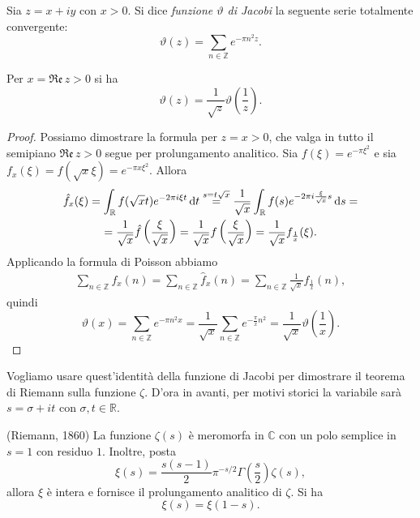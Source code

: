 \begin{defn}
  Sia $z=x+iy$ con $x>0$. Si dice \textit{funzione $\vartheta$ di Jacobi} la seguente serie totalmente convergente:
  $$\vartheta(z)=\sum_{n \in \mathbb{Z}} e^{-\pi n^2z}.$$
\end{defn}

\begin{lm}
  Per $x=\mathfrak{Re}\,z>0$ si ha
  $$\vartheta(z)=\frac{1}{\sqrt{z}}\vartheta\left(\frac{1}{z}\right).$$
\end{lm}

\begin{proof}
  Possiamo dimostrare la formula per $z=x>0$, che valga in tutto il semipiano $\mathfrak{Re}\,z>0$ segue per prolungamento analitico. Sia $f(\xi)=e^{-\pi\xi^2}$ e sia $f_x(\xi)=f(\sqrt{x}\xi)=e^{-\pi x\xi^2}$. Allora
  \begin{gather*}
    \hat{f}_x(\xi)=\int_{\mathbb{R}} f(\sqrt{x}t)e^{-2\pi i\xi t}\mathop{}\!\mathrm{d} t \overset{s=t\sqrt{x}}{=} \frac{1}{\sqrt{x}}\int_{\mathbb{R}} f(s)e^{-2\pi i\frac{\xi}{\sqrt{x}}s}\mathop{}\!\mathrm{d} s= \\
    =\frac{1}{\sqrt{x}}\hat{f}\left(\frac{\xi}{\sqrt{x}}\right)=\frac{1}{\sqrt{x}}f\left(\frac{\xi}{\sqrt{x}}\right)=\frac{1}{\sqrt{x}}f_{\frac{1}{x}}(\xi).
  \end{gather*}
  Applicando la formula di Poisson abbiamo
  \begin{gather*}
    \sum_{n \in \mathbb{Z}} f_x(n)=\sum_{n \in \mathbb{Z}} \hat{f}_x(n)=\sum_{n \in \mathbb{Z}} \frac{1}{\sqrt{x}}f_{\frac{1}{x}}(n),
  \end{gather*}
  quindi
  $$\vartheta(x)=\sum_{n \in \mathbb{Z}} e^{-\pi n^2x}=\frac{1}{\sqrt{x}}\sum_{n \in \mathbb{Z}}e^{-\frac{\pi}{x}n^2}=\frac{1}{\sqrt{x}}\vartheta\left(\frac{1}{x}\right).$$
\end{proof}

Vogliamo usare quest'identità della funzione di Jacobi per dimostrare il teorema di Riemann sulla funzione $\zeta$. D'ora in avanti, per motivi storici la variabile sarà $s=\sigma+it$ con $\sigma, t \in \mathbb{R}$.

\begin{thm}
  (Riemann, 1860) La funzione $\zeta(s)$ è meromorfa in $\mathbb{C}$ con un polo semplice in $s=1$ con residuo $1$. Inoltre, posta
  $$\xi(s)=\frac{s(s-1)}{2}\pi^{-s/2}\Gamma\left(\frac{s}{2}\right)\zeta(s),$$
  allora $\xi$ è intera e fornisce il prolungamento analitico di $\zeta$. Si ha
  \begin{equation} \label{xifunctional}
    \xi(s)=\xi(1-s).
  \end{equation}
\end{thm}

